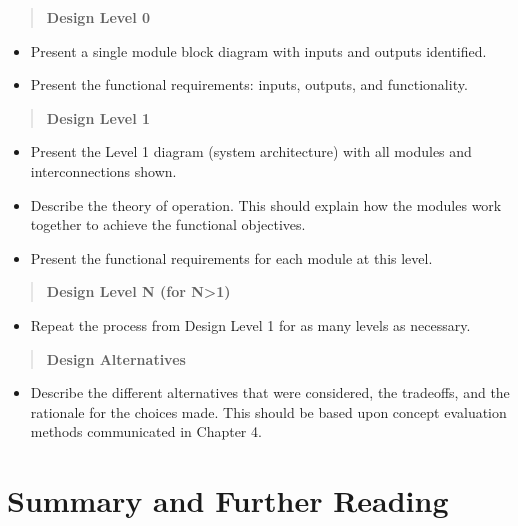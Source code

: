 \begin{quote}
\textbf{Design Level 0}
\end{quote}

\begin{itemize}
\item
  Present a single module block diagram with inputs and outputs
  identified.
\item
  Present the functional requirements: inputs, outputs, and
  functionality.
\end{itemize}

\begin{quote}
\textbf{Design Level 1}
\end{quote}

\begin{itemize}
\item
  Present the Level 1 diagram (system architecture) with all modules and
  interconnections shown.
\item
  Describe the theory of operation. This should explain how the modules
  work together to achieve the functional objectives.
\item
  Present the functional requirements for each module at this level.
\end{itemize}

\begin{quote}
\textbf{Design Level N (for N\textgreater1)}
\end{quote}

\begin{itemize}
\item
  Repeat the process from Design Level 1 for as many levels as
  necessary.
\end{itemize}

\begin{quote}
\textbf{Design Alternatives}
\end{quote}

\begin{itemize}
\item
  Describe the different alternatives that were considered, the
  tradeoffs, and the rationale for the choices made. This should be
  based upon concept evaluation methods communicated in Chapter 4.
\end{itemize}

\section{Summary and Further Reading}
\label{section:summary-and-further-reading}

